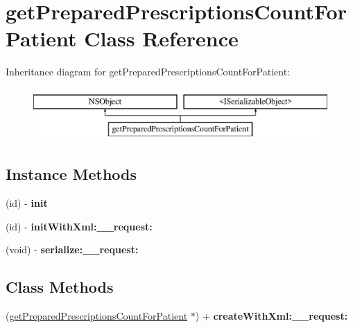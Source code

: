 \hypertarget{interfaceget_prepared_prescriptions_count_for_patient}{}\section{get\+Prepared\+Prescriptions\+Count\+For\+Patient Class Reference}
\label{interfaceget_prepared_prescriptions_count_for_patient}
Inheritance diagram for get\+Prepared\+Prescriptions\+Count\+For\+Patient\+:\begin{figure}[H]
\begin{center}
\leavevmode
\includegraphics[height=2.000000cm]{interfaceget_prepared_prescriptions_count_for_patient}
\end{center}
\end{figure}
\subsection*{Instance Methods}
\begin{DoxyCompactItemize}
\item 
\hypertarget{interfaceget_prepared_prescriptions_count_for_patient_aa2382db178fedf5ef4668fe1a3bbc87f}{}(id) -\/ {\bfseries init}\label{interfaceget_prepared_prescriptions_count_for_patient_aa2382db178fedf5ef4668fe1a3bbc87f}

\item 
\hypertarget{interfaceget_prepared_prescriptions_count_for_patient_a9c78c9343badf6ec9e48684613696462}{}(id) -\/ {\bfseries init\+With\+Xml\+:\+\_\+\+\_\+request\+:}\label{interfaceget_prepared_prescriptions_count_for_patient_a9c78c9343badf6ec9e48684613696462}

\item 
\hypertarget{interfaceget_prepared_prescriptions_count_for_patient_a5d8b6d09e2f60e29a088bff2f1c628e0}{}(void) -\/ {\bfseries serialize\+:\+\_\+\+\_\+request\+:}\label{interfaceget_prepared_prescriptions_count_for_patient_a5d8b6d09e2f60e29a088bff2f1c628e0}

\end{DoxyCompactItemize}
\subsection*{Class Methods}
\begin{DoxyCompactItemize}
\item 
\hypertarget{interfaceget_prepared_prescriptions_count_for_patient_af007be861721433a4e38fa18652ab31b}{}(\hyperlink{interfaceget_prepared_prescriptions_count_for_patient}{get\+Prepared\+Prescriptions\+Count\+For\+Patient} $\ast$) + {\bfseries create\+With\+Xml\+:\+\_\+\+\_\+request\+:}\label{interfaceget_prepared_prescriptions_count_for_patient_af007be861721433a4e38fa18652ab31b}

\end{DoxyCompactItemize}
